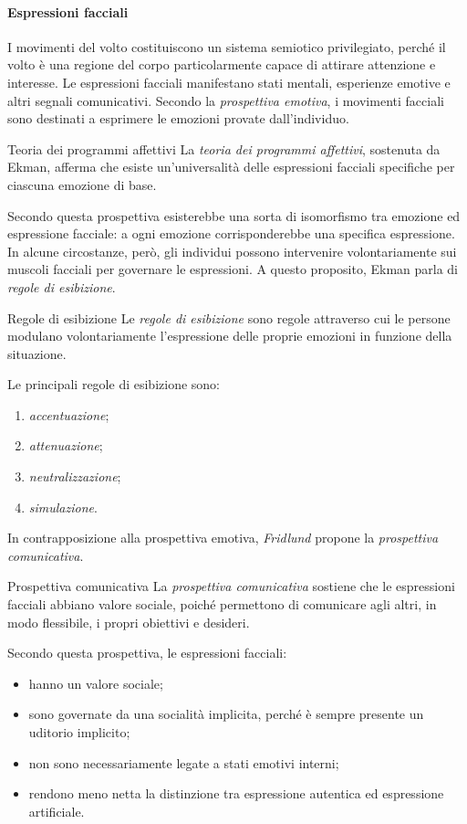 \documentclass[a4paper]{article}
\begin{document}
\paragraph{Espressioni facciali}
I movimenti del volto costituiscono un sistema semiotico privilegiato, perché il volto è una regione del corpo particolarmente capace di attirare attenzione e interesse.
Le espressioni facciali manifestano stati mentali, esperienze emotive e altri segnali comunicativi.
Secondo la \emph{prospettiva emotiva}, i movimenti facciali sono destinati a esprimere le emozioni provate dall'individuo.
\begin{snippetdefinition}{Teoria dei programmi affettivi}
    La \emph{teoria dei programmi affettivi}, sostenuta da Ekman, afferma che esiste un'universalità delle espressioni facciali specifiche per ciascuna emozione di base.
\end{snippetdefinition}
Secondo questa prospettiva esisterebbe una sorta di isomorfismo tra emozione ed espressione facciale: a ogni emozione corrisponderebbe una specifica espressione.
In alcune circostanze, però, gli individui possono intervenire volontariamente sui muscoli facciali per governare le espressioni. A questo proposito, Ekman parla di \emph{regole di esibizione}.
\begin{snippetdefinition}{Regole di esibizione}
    Le \emph{regole di esibizione} sono regole attraverso cui le persone modulano volontariamente l'espressione delle proprie emozioni in funzione della situazione.
\end{snippetdefinition}
Le principali regole di esibizione sono:
\begin{enumerate}
    \item \emph{accentuazione};
    \item \emph{attenuazione};
    \item \emph{neutralizzazione};
    \item \emph{simulazione}.
\end{enumerate}
In contrapposizione alla prospettiva emotiva, \emph{Fridlund} propone la \emph{prospettiva comunicativa}.
\begin{snippetdefinition}{Prospettiva comunicativa}
    La \emph{prospettiva comunicativa} sostiene che le espressioni facciali abbiano valore sociale, poiché permettono di comunicare agli altri, in modo flessibile, i propri obiettivi e desideri.
\end{snippetdefinition}
Secondo questa prospettiva, le espressioni facciali:
\begin{itemize}
    \item hanno un valore sociale;
    \item sono governate da una socialità implicita, perché è sempre presente un uditorio implicito;
    \item non sono necessariamente legate a stati emotivi interni;
    \item rendono meno netta la distinzione tra espressione autentica ed espressione artificiale.
\end{itemize}
\end{document}
